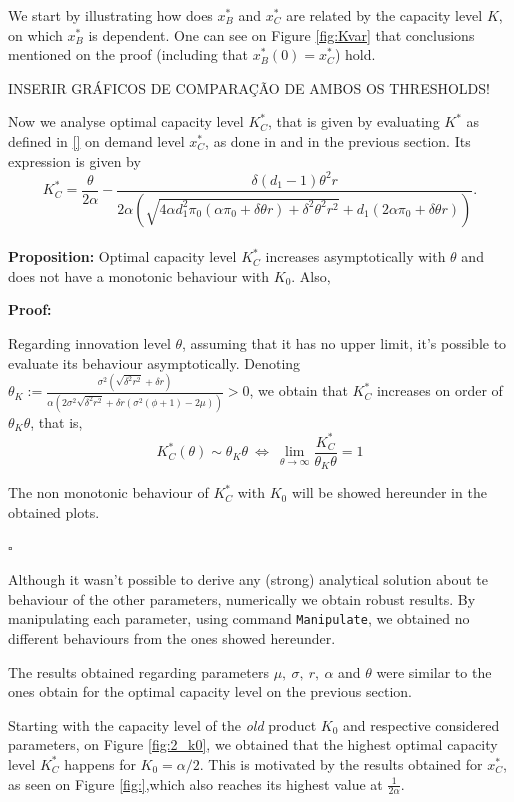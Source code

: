 We start by illustrating how does $x^*_B$ and $x^*_C$ are related by the capacity level $K$, on which $x^*_B$ is dependent. One can see on Figure \ref{fig:Kvar} that conclusions mentioned on the proof (including that $x^*_B(0)=x^*_C$) hold.


INSERIR GRÁFICOS DE COMPARAÇÃO DE AMBOS OS THRESHOLDS!

Now we analyse optimal capacity level $K^*_C$, that is given by evaluating $K^*$ as defined in \eqref{} on demand level $x^*_C$, as done in \cite{huis:cap} and in the previous section. Its expression is given by
$$K^*_C=\frac{\theta }{2 \alpha }-\frac{\delta  (d_1-1) \theta ^2 r}{2 \alpha  \left(\sqrt{4 \alpha  d_1^2 \pi_0 (\alpha  \pi_0+\delta  \theta  r)+\delta ^2 \theta ^2 r^2}+d_1 (2 \alpha  \pi_0+\delta  \theta  r)\right)}.$$\\

\textbf{Proposition:}
Optimal capacity level $K^*_C$ increases asymptotically with $\theta$ and does not have a monotonic behaviour with $K_0$. Also, 

\textbf{Proof:}

Regarding innovation level $\theta$, assuming that it has no upper limit, it's possible to evaluate its behaviour asymptotically. Denoting $\theta_K:=\frac{\sigma ^2 \left(\sqrt{\delta ^2 r^2}+\delta  r\right)}{\alpha  \left(2 \sigma ^2 \sqrt{\delta ^2 r^2}+\delta  r \left(\sigma ^2 (\phi +1)-2 \mu \right)\right)}>0$, we obtain that $K^*_C$ increases on order of $\theta_K \theta$, that is,
$$K^*_C(\theta) \sim \theta_K \theta \ \Leftrightarrow \ \lim_{\theta \to \infty}  \frac{K^*_C}{\theta_K \theta}=1 $$


The non monotonic behaviour of $K^*_C$ with $K_0$ will be showed hereunder in the obtained plots.
\begin{flushright}
	$\square$
\end{flushright}

Although it wasn't possible to derive any (strong) analytical solution about te behaviour of the other parameters, numerically we obtain robust results. By manipulating each parameter, using command \texttt{Manipulate}, we obtained no different behaviours from the ones showed hereunder.

The results obtained regarding parameters $\mu, \ \sigma,\ r, \ \alpha$ and $\theta$  were similar to the ones obtain for the optimal capacity level on the previous section.

Starting with the capacity level of the \textit{old} product $K_0$ and respective considered parameters, on Figure \ref{fig:2_k0}, we obtained that the highest optimal capacity level $K^*_C$ happens for $K_0=\alpha/2$. This is motivated by the results obtained for $x^*_C$, as seen on Figure \ref{fig:},which also reaches its highest value at $\frac{1}{2 \alpha}$.

